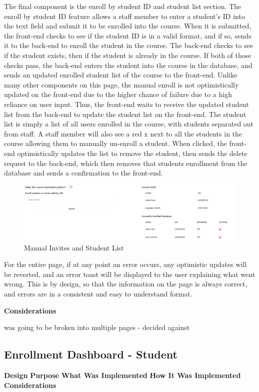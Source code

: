 The final component is the enroll by student ID and student list section. The enroll by student ID feature allows a staff member to enter a student's ID into the text field and submit it to be enrolled into the course. When it is submitted, the front-end checks to see if the student ID is in a valid format, and if so, sends it to the back-end to enroll the student in the course. The back-end checks to see if the student exists, then if the student is already in the course. If both of those checks pass, the back-end enters the student into the course in the database, and sends an updated enrolled student list of the course to the front-end. Unlike many other components on this page, the manual enroll is not optimistically updated on the front-end due to the higher chance of failure due to a high reliance on user input. Thus, the front-end waits to receive the updated student list from the back-end to update the student list on the front-end. The student list is simply a list of all users enrolled in the course, with students separated out from staff. A staff member will also see a red x next to all the students in the course allowing them to manually un-enroll a student. When clicked, the front-end optimistically updates the list to remove the student, then sends the delete request to the back-end, which then removes that students enrollment from the database and sends a confirmation to the front-end.

\begin{figure}[h!]
    \centering
    \includegraphics[scale=0.1]{images/accounts-staff-student.jpg}
    \caption{Manual Invites and Student List}
\end{figure}

For the entire page, if at any point an error occurs, any optimistic updates will be reverted, and an error toast will be displayed to the user explaining what went wrong. This is by design, so that the information on the page is always correct, and errors are in a consistent and easy to understand format.

\textbf{Considerations}

was going to be broken into multiple pages - decided against

\subsection{Enrollment Dashboard - Student}

\textbf{Design}
\textbf{Purpose}
\textbf{What Was Implemented}
\textbf{How It Was Implemented}
\textbf{Considerations}